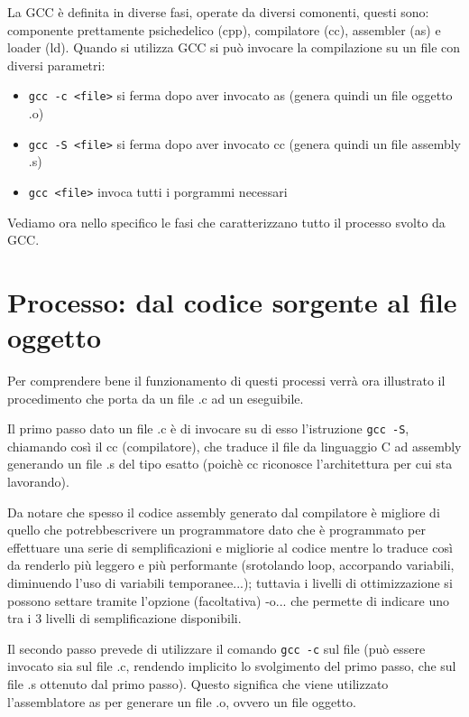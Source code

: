 \documentclass[class=book, crop=false, oneside]{standalone}
\begin{document}
La GCC è definita in diverse fasi, operate da diversi comonenti, questi sono: componente prettamente psichedelico (cpp), compilatore (cc), assembler (as) e loader (ld).
Quando si utilizza GCC si può invocare la compilazione su un file con diversi parametri:
\begin{itemize}
	\item \texttt{gcc -c <file>} si ferma dopo aver invocato as (genera quindi un file oggetto .o)
	\item \texttt{gcc -S <file>} si ferma dopo aver invocato cc (genera quindi un file assembly .s)
	\item \texttt{gcc <file>} invoca tutti i porgrammi necessari
\end{itemize}
Vediamo ora nello specifico le fasi che caratterizzano tutto il processo svolto da GCC.

\section{Processo: dal codice sorgente al file oggetto}

Per comprendere bene il funzionamento di questi processi verrà ora illustrato il procedimento che porta da un file .c ad un eseguibile.

Il primo passo dato un file .c è di invocare su di esso l'istruzione \texttt{gcc -S}, chiamando così il cc (compilatore), che traduce il file da linguaggio C ad assembly generando un file .s del tipo esatto (poichè cc riconosce l'architettura per cui sta lavorando).

Da notare che spesso il codice assembly generato dal compilatore è migliore di quello che potrebbescrivere un programmatore dato che è programmato per effettuare una serie di semplificazioni e migliorie al codice mentre lo traduce così da renderlo più leggero e più performante (srotolando loop, accorpando variabili, diminuendo l'uso di variabili temporanee...); tuttavia i livelli di ottimizzazione si possono settare tramite l'opzione (facoltativa) -o... che permette di indicare uno tra i 3 livelli di semplificazione disponibili.

Il secondo passo prevede di utilizzare il comando \texttt{gcc -c} sul file (può essere invocato sia sul file .c, rendendo implicito lo svolgimento del primo passo, che sul file .s ottenuto dal primo passo). Questo significa che viene utilizzato l'assemblatore as per generare un file .o, ovvero un file oggetto.
\end{document}
